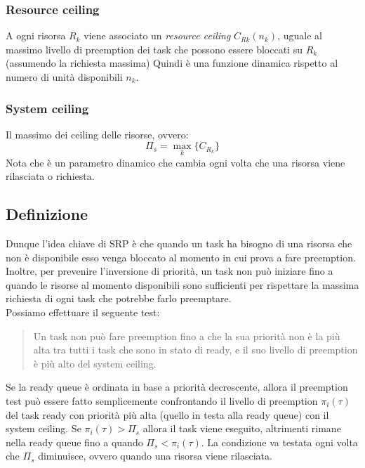 \documentclass[12pt,openany,onesided]{book}
\begin{document}
\subsubsection{Resource ceiling}
A ogni risorsa $R_k$ viene associato un \textit{resource ceiling} $C_{Rk}(n_k)$, uguale al massimo livello di preemption dei task che possono essere bloccati su $R_k$ (assumendo la richiesta massima)
Quindi è una funzione dinamica rispetto al numero di unità disponibili $n_k$.
\subsubsection{System ceiling}
Il massimo dei ceiling delle risorse, ovvero:
\begin{equation*}
    \Pi_s = \max_{k} \{C_{R_k}\}
\end{equation*}
Nota che è un parametro dinamico che cambia ogni volta che una risorsa viene rilasciata o richiesta.
\subsection{Definizione}
Dunque l'idea chiave di SRP è che quando un task ha bisogno di una risorsa che non è disponibile esso venga bloccato al momento in cui prova a fare preemption.
Inoltre, per prevenire l'inversione di priorità, un task non può iniziare fino a quando le risorse al momento disponibili sono sufficienti per rispettare la massima richiesta di ogni task che potrebbe farlo preemptare.
\\
Possiamo effettuare il seguente test: \\
\begin{quote}
    Un task non può fare preemption fino a che la sua priorità non è la più alta tra tutti i task che sono in stato di ready, e il suo livello di preemption è
    più alto del system ceiling.
\end{quote}
Se la ready queue è ordinata in base a priorità decrescente, allora il preemption test può essere fatto semplicemente confrontando il livello di preemption $\pi_i(\tau)$ del task ready con priorità più alta
(quello in testa alla ready queue) con il system ceiling.
Se $\pi_i(\tau) > \Pi_s$ allora il task viene eseguito, altrimenti rimane nella ready queue fino a quando $\Pi_s < \pi_i(\tau)$.
La condizione va testata ogni volta che $ \Pi_s $ diminuisce, ovvero quando una risorsa viene rilasciata.
\end{document}
